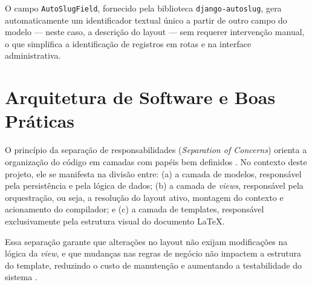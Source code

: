 O campo \texttt{AutoSlugField}, fornecido pela biblioteca \texttt{django-autoslug}, gera
automaticamente um identificador textual único a partir de outro campo do modelo — neste caso, a
descrição do layout — sem requerer intervenção manual, o que simplifica a identificação de registros em
rotas e na interface administrativa.

\section{Arquitetura de Software e Boas Práticas}
\label{sec:arquitetura}

O princípio da separação de responsabilidades (\textit{Separation of Concerns}) orienta a organização do
código em camadas com papéis bem definidos \cite{dijkstra1982}. No contexto deste projeto, ele se
manifesta na divisão entre: (a) a camada de modelos, responsável pela persistência e pela lógica de
dados; (b) a camada de \textit{views}, responsável pela orquestração, ou seja, a resolução do layout ativo, montagem
do contexto e acionamento do compilador; e (c) a camada de templates, responsável exclusivamente pela
estrutura visual do documento LaTeX.

Essa separação garante que alterações no layout não exijam modificações na lógica da \textit{view}, e
que mudanças nas regras de negócio não impactem a estrutura do template, reduzindo o custo de
manutenção e aumentando a testabilidade do sistema \cite{martin2002}.